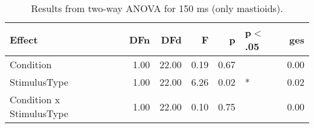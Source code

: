 \begin{table}[ht]
\centering
\begin{tabulary}{\textwidth}{lrrrrlr}
  \toprule
Effect & DFn & DFd & F & p & p$<$.05 & ges \\ 
  \midrule
Condition & 1.00 & 22.00 & 0.19 & 0.67 &  & 0.00 \\ 
  StimulusType & 1.00 & 22.00 & 6.26 & 0.02 & * & 0.02 \\ 
  Condition x StimulusType & 1.00 & 22.00 & 0.10 & 0.75 &  & 0.00 \\ 
   \bottomrule
\end{tabulary}
\caption{Results from two-way ANOVA for 150 ms (only mastioids).} 
\end{table}
